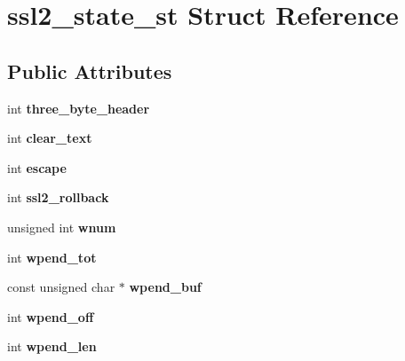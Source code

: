 \hypertarget{structssl2__state__st}{}\section{ssl2\+\_\+state\+\_\+st Struct Reference}
\label{structssl2__state__st}
\subsection*{Public Attributes}
\begin{DoxyCompactItemize}
\item 
\mbox{\label{structssl2__state__st_a65dd8015e198ff0042ac720ed7aaf349}} 
int {\bfseries three\+\_\+byte\+\_\+header}
\item 
\mbox{\label{structssl2__state__st_ababb069796570023851a5b43a79e18fd}} 
int {\bfseries clear\+\_\+text}
\item 
\mbox{\label{structssl2__state__st_a222f404603c3d628201053adf8777cf7}} 
int {\bfseries escape}
\item 
\mbox{\label{structssl2__state__st_a4f412c07d8413d68b6c876c606924001}} 
int {\bfseries ssl2\+\_\+rollback}
\item 
\mbox{\label{structssl2__state__st_ae33bd4e0b04e70d85f982b978b4d1be6}} 
unsigned int {\bfseries wnum}
\item 
\mbox{\label{structssl2__state__st_ac50b123c8bdeb713b84a0e479f4d1eb5}} 
int {\bfseries wpend\+\_\+tot}
\item 
\mbox{\label{structssl2__state__st_a887ba9e86d2c926a8af93e818455fcfd}} 
const unsigned char $\ast$ {\bfseries wpend\+\_\+buf}
\item 
\mbox{\label{structssl2__state__st_ad01fd1f61618a671614ade83346d594b}} 
int {\bfseries wpend\+\_\+off}
\item 
\mbox{\label{structssl2__state__st_a5204f12e0ff573a1b4279ef07c5001b2}} 
int {\bfseries wpend\+\_\+len}
\item 

\end{DoxyCompactItemize}
